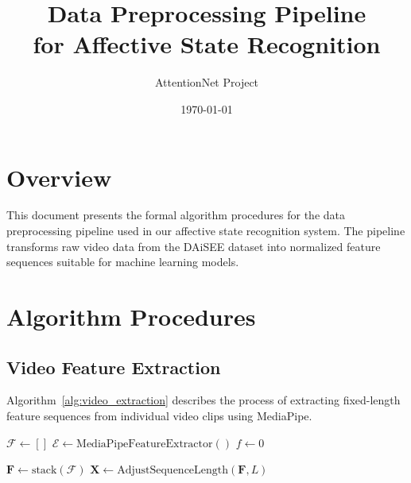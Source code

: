 \documentclass{article}
\begin{document}
\title{Data Preprocessing Pipeline\\for Affective State Recognition}
\author{AttentionNet Project}
\date{\today}
\maketitle

\section{Overview}

This document presents the formal algorithm procedures for the data preprocessing pipeline used in our affective state recognition system. The pipeline transforms raw video data from the DAiSEE dataset into normalized feature sequences suitable for machine learning models.

\section{Algorithm Procedures}

\subsection{Video Feature Extraction}

Algorithm~\ref{alg:video_extraction} describes the process of extracting fixed-length feature sequences from individual video clips using MediaPipe.

\begin{algorithm}[H]
\caption{Video Feature Extraction and Sequence Normalization}
\label{alg:video_extraction}

\BlankLine
\SetAlgoVlined
$\mathcal{F} \leftarrow []$ 
$\mathcal{E} \leftarrow \text{MediaPipeFeatureExtractor}()$ 
$f \leftarrow 0$ 

\BlankLine
{}

\BlankLine
{}

\BlankLine
$\mathbf{F} \leftarrow \text{stack}(\mathcal{F})$ 
$\mathbf{X} \leftarrow \text{AdjustSequenceLength}(\mathbf{F}, L)$ 

\BlankLine
{}
\end{algorithm}
\end{document}
